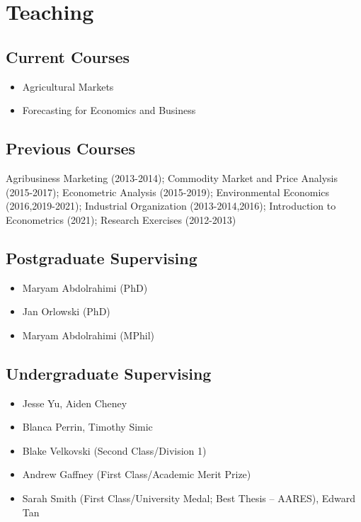 \documentclass[10pt]{article}
\begin{document}
	\bigskip
	
	\section*{Teaching}
	
	\subsection*{Current Courses}
	\begin{itemize}
		\item {} Agricultural Markets
		\item {} Forecasting for Economics and Business
	\end{itemize}
	
	\subsection*{Previous Courses}	
	Agribusiness Marketing (2013-2014); Commodity Market and Price Analysis (2015-2017); Econometric Analysis (2015-2019); Environmental Economics (2016,2019-2021); Industrial Organization (2013-2014,2016); Introduction to Econometrics (2021); Research Exercises (2012-2013)
	
	\subsection*{Postgraduate Supervising}	
	\begin{itemize}
		\item {} Maryam Abdolrahimi (PhD)
		\item {} Jan Orlowski (PhD)
		\item {} Maryam Abdolrahimi (MPhil)
	\end{itemize}
	
	\subsection*{Undergraduate Supervising}	
	\begin{itemize}
		\item {} Jesse Yu, Aiden Cheney
		\item {} Blanca Perrin, Timothy Simic
		\item {} Blake Velkovski (Second Class/Division 1)
		\item {} Andrew Gaffney (First Class/Academic Merit Prize)
		\item {} Sarah Smith (First Class/University Medal; Best Thesis -- AARES), Edward Tan
	\end{itemize}
	
\end{document}
